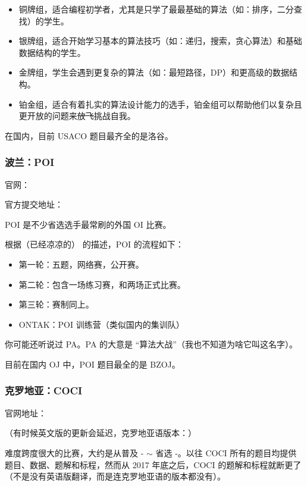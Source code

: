 \begin{itemize}
\item 铜牌组，适合编程初学者，尤其是只学了最最基础的算法（如：排序，二分查找）的学生。
\item 银牌组，适合开始学习基本的算法技巧（如：递归，搜索，贪心算法）和基础数据结构的学生。
\item 金牌组，学生会遇到更复杂的算法（如：最短路径，DP）和更高级的数据结构。
\item 铂金组，适合有着扎实的算法设计能力的选手，铂金组可以帮助他们以复杂且更开放的问题来\st{放飞}挑战自我。
\end{itemize}

在国内，目前 USACO 题目最齐全的是洛谷。

\subsubsection{波兰：POI}

官网：\href{https://oi.edu.pl/}{}  

官方提交地址：\href{https://szkopul.edu.pl/p/default/problemset/}{}  

POI 是不少省选选手最常刷的外国 OI 比赛。  

根据（已经凉凉的）\href{http://main.edu.pl/en/}{} 的描述，POI 的流程如下：  

\begin{itemize}
\item 第一轮：五题，网络赛，公开赛。
\item 第二轮：包含一场练习赛，和两场正式比赛。
\item 第三轮：赛制同上。
\item ONTAK：POI 训练营（类似国内的集训队）
\end{itemize}

你可能还听说过 PA。PA 的大意是 “算法大战”（我也不知道为啥它叫这名字）。

目前在国内 OJ 中，POI 题目最全的是 BZOJ。

\subsubsection{克罗地亚：COCI}

官网地址：\href{http://www.hsin.hr/coci/}{}  

（有时候英文版的更新会延迟，克罗地亚语版本：\href{http://www.hsin.hr/honi/}{}）

难度跨度很大的比赛，大约是从普及 - $\sim$ 省选 -。以往 COCI 所有的题目均提供题目、数据、题解和标程，然而从 2017 年底之后，COCI 的题解和标程就断更了（不是没有英语版翻译，而是连克罗地亚语的版本都没有）。

